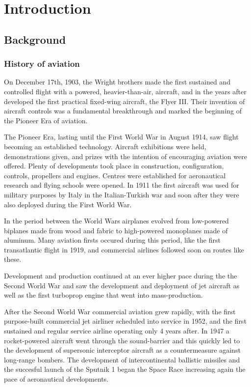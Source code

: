 \chapter{Introduction}\label{chapter:introduction}


\section{Background}

\subsection{History of aviation}
On December 17th, 1903, the Wright brothers made the first sustained and
controlled flight with a powered, heavier-than-air, aircraft, and in the years
after developed the first practical fixed-wing aircraft, the Flyer III. Their
invention of aircraft controls was a fundamental breakthrough and marked the
beginning of the Pioneer Era of aviation.

The Pioneer Era, lasting until the First World War in August 1914, saw flight
becoming an established technology. Aircraft exhibitions were held,
demonstrations given, and prizes with the intention of encouraging aviation were
offered. Plenty of developments took place in construction, configuration,
controls, propellers and engines. Centres were established for aeronautical
research and flying schools were opened. In 1911 the first aircraft was used for
military purposes by Italy in the Italian-Turkish war and soon after they were
also deployed during the First World War.

In the period between the World Wars airplanes evolved from low-powered biplanes
made from wood and fabric to high-powered monoplanes made of aluminum. Many
aviation firsts occured during this period, like the first transatlantic flight
in 1919, and commercial airlines followed soon on routes like these.

Development and production continued at an ever higher pace during the
the Second World War and saw the development and deployment of jet aircraft
as well as the first turboprop engine that went into mass-production.

After the Second World War commercial aviation grew rapidly, with the first
purpose-built commercial jet airliner scheduled into service in 1952, and the
first sustained and regular service airline operating only 4 years after.
In 1947 a rocket-powered aircraft went through the sound-barrier and
this quickly led to the development of supersonic interceptor aircraft as a
countermeasure against long-range bombers. The development of intercontinental
ballistic missiles and the succesful launch of the Sputnik 1 began the Space
Race increasing again the pace of aeronautical developments.

